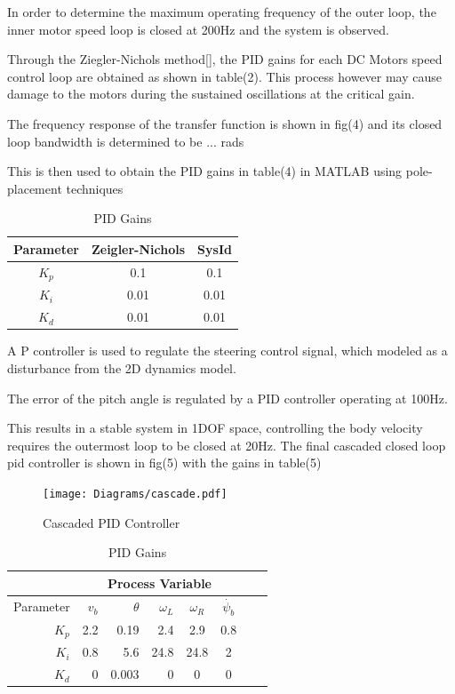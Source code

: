         In order to determine the maximum operating frequency of the outer loop, 
        the inner motor speed loop is closed at 200Hz and the system is observed.
        
        Through the Ziegler-Nichols method[], the PID gains for each DC Motors speed control loop 
        are obtained as shown in table(2). This process however may cause damage to the motors 
        during the sustained oscillations at the critical gain. 
       
        The frequency response of the transfer function is shown in fig(4) 
        and its closed loop bandwidth is determined to be ... rads

        This is then used to obtain the PID gains in table(4) in MATLAB using pole-placement techniques
        \begin{table}[H]
            \centering
            \begin{tabular}{|c|c|c|}
                \hline
                Parameter & Zeigler-Nichols & SysId \\
                \hline 
                $K_p$ & 0.1 & 0.1 \\
                $K_i$ & 0.01 & 0.01 \\
                $K_d$ & 0.01 & 0.01 \\
                \hline
            \end{tabular}
            \caption{PID Gains}
        \end{table}

        A P controller is used to regulate the steering control signal, which modeled
        as a disturbance from the 2D dynamics model.

        The error of the pitch angle is regulated by a PID controller operating at 100Hz. 
        
        This results in a stable system in 1DOF space, controlling the body velocity requires the outermost loop to be closed at 20Hz.
        The final cascaded closed loop pid controller is shown in fig(5) with the gains in table(5)

        \begin{figure}[H]
            \texttt{[image: Diagrams/cascade.pdf]}
            \caption{Cascaded PID Controller}
        \end{figure}

        \begin{table}[H]
            \centering
            \begin{tabular}{|r|r|r|r|c|c|c|c}
                \hline
                & \multicolumn{5}{c|}{Process Variable}  \\
                \hline
                Parameter & $v_b$ & $\theta$  & $\omega_L$ & $\omega_R$ & $\dot{\psi_b}$ \\
                \hline      
                $K_p$ & 2.2 & 0.19 & 2.4 & 2.9 & 0.8 \\
                $K_i$ & 0.8 & 5.6 & 24.8 & 24.8 & 2\\
                $K_d$ & 0 & 0.003 & 0 & 0  &  0\\
                \hline
            \end{tabular}
            \caption{PID Gains}
        \end{table}
        \pagebreak{}
